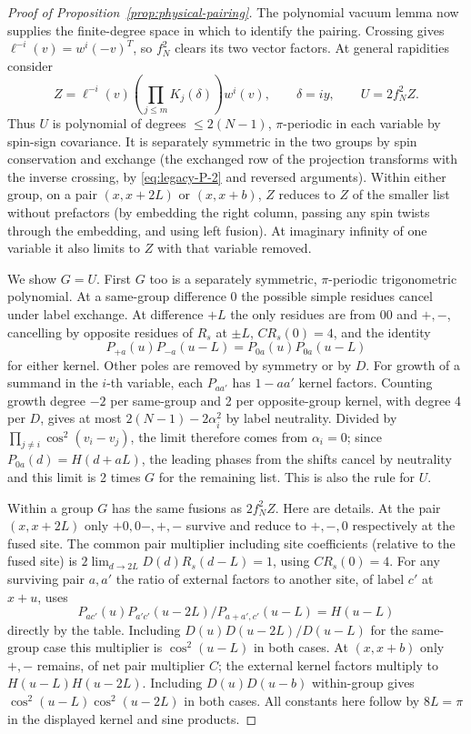 \begin{proof}[Proof of Proposition~\ref{prop:physical-pairing}]
The polynomial vacuum lemma now supplies the finite-degree space in which to identify the pairing. Crossing gives \(\ell^{-i}(v)=w^i(-v)^T\), so \(f_N^2\) clears its two vector factors. At general rapidities consider
\[
 Z=\ell^{-i}(v)\left(\prod_{j\le m}K_j(\delta)\right) w^i(v),\qquad
 \delta=i y,\qquad U=2 f_N^2 Z.
\]
Thus \(U\) is polynomial of degrees \(\le 2(N-1)\), \(\pi\)-periodic in each variable by spin-sign covariance. It is separately symmetric in the two groups by spin conservation and exchange (the exchanged row of the projection transforms with the inverse crossing, by \eqref{eq:legacy-P-2} and reversed arguments). Within either group, on a pair \((x,x+2L)\) or \((x,x+b)\), \(Z\) reduces to \(Z\) of the smaller list without prefactors (by embedding the right column, passing any spin twists through the embedding, and using left fusion). At imaginary infinity of one variable it also limits to \(Z\) with that variable removed.

We show \(G=U\). First \(G\) too is a separately symmetric, \(\pi\)-periodic trigonometric polynomial. At a same-group difference 0 the possible simple residues cancel under label exchange. At difference \(+L\) the only residues are from \(00\) and \(+,-\), cancelling by opposite residues of \(R_s\) at \(\pm L\), \(C R_s(0)=4\), and the identity
\[
 P_{+a}(u)P_{-a}(u-L)=P_{0a}(u)P_{0a}(u-L)
\]
for either kernel. Other poles are removed by symmetry or by \(D\). For growth of a summand in the \(i\)-th variable, each \(P_{a a'}\) has \(1-aa'\) kernel factors. Counting growth degree \(-2\) per same-group and 2 per opposite-group kernel, with degree 4 per \(D\), gives at most \(2(N-1)-2\alpha_i^2\) by label neutrality. Divided by \(\prod_{j\ne i}\cos^2(v_i-v_j)\), the limit therefore comes from \(\alpha_i=0\); since \(P_{0a}(d)=H(d+a L)\), the leading phases from the shifts cancel by neutrality and this limit is 2 times \(G\) for the remaining list. This is also the rule for \(U\).

Within a group \(G\) has the same fusions as \(2 f_N^2 Z\). Here are details. At the pair \((x,x+2L)\) only \(+0,0-,+,-\) survive and reduce to \(+, -,0\) respectively at the fused site. The common pair multiplier including site coefficients (relative to the fused site) is \(2\lim_{d\to2L} D(d)R_s(d-L)=1\), using \(C R_s(0)=4\). For any surviving pair \(a,a'\) the ratio of external factors to another site, of label \(c'\) at \(x+u\), uses
\[
 P_{a c'}(u)P_{a' c'}(u-2L)/P_{a+a',c'}(u-L)=H(u-L)
\]
directly by the table. Including \(D(u)D(u-2L)/D(u-L)\) for the same-group case this multiplier is \(\cos^2(u-L)\) in both cases. At \((x,x+b)\) only \(+,-\) remains, of net pair multiplier \(C\); the external kernel factors multiply to \(H(u-L)H(u-2L)\). Including \(D(u)D(u-b)\) within-group gives \(\cos^2(u-L)\cos^2(u-2L)\) in both cases. All constants here follow by \(8L=\pi\) in the displayed kernel and sine products.


\end{proof}
